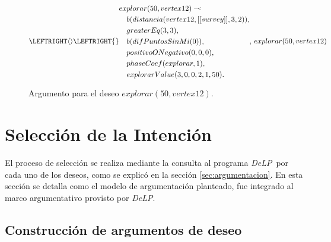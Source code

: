 \documentclass[oneside]{book}
\theoremstyle{definition}
\newcommand{\DLP}{\mbox{\textit{DeLP}}}
\newcommand{\defleftarrow}{{\raise1.5pt\hbox{\tiny\defleft}}}
\newcommand{\defleft}{\mbox{---\hspace{-1.5pt}\raise.05pt\hbox{$<$}}}
\begin{document}
\begin{figure}


\begin{equation*}
\LEFTRIGHT\langle\rangle{
\LEFTRIGHT\{\}{
\begin{aligned}
ex&plorar(50, vertex12)\; \defleftarrow \; \\
    &b(distancia(vertex12, [[survey]], 3, 2)), \\
    &greaterEq(3, 3),\\
    &b(difPuntosSinMi(0)),\\
    &positivoONegativo(0, 0, 0),\\
    &phaseCoef(explorar, 1),\\
    &explorarValue(3, 0, 0, 2, 1, 50).
\end{aligned}
}
,\, explorar(50, vertex12) 
}
\end{equation*}



\caption{Argumento para el deseo $explorar(50, vertex12)$.}
\label{fig:ejemploArgDeseo}
\end{figure}

\section{Selección de la Intención}

El proceso de selección se realiza mediante la consulta al programa \DLP\ por cada
uno de los deseos, como se explicó en la sección \ref{sec:argumentacion}. 
En esta sección se detalla como el modelo de argumentación planteado, fue integrado al marco
argumentativo provisto por \DLP.

\subsection{Construcción de argumentos de deseo}
\end{document}
